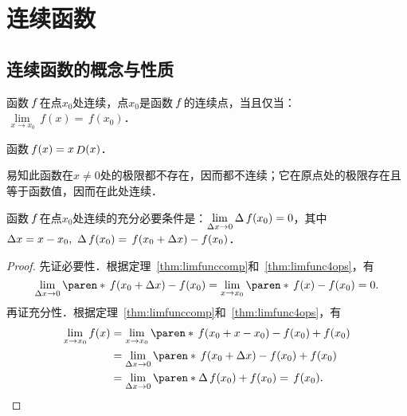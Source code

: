 \chapter{连续函数}
\label{ch:cont}

\section{连续函数的概念与性质}

\begin{definition}[连续]
  \label{defn:cont}
  函数\(\,f\mkern2mu\)在点\(x_0\)处连续，点\(x_0\)是函数\(\,f\mkern2mu\)的连续点，当且仅当：\(\!\lim\limits_{\,x\to x_0\!} \,f(x) = \,f(x_0)\)．
\end{definition}

\begin{example*}
  函数\(\,f(x) = x \mathop{\relax D}\nolimits(x)\)．

  \begin{remark}
    易知此函数在\(x \ne 0\)处的极限都不存在，因而都不连续；它在原点处的极限存在且等于函数值，因而在此处连续．
  \end{remark}
\end{example*}

\begin{theorem}
  \label{thm:contequivdefn}
  函数\(\,f\mkern2mu\)在点\(x_0\)处连续的充分必要条件是：\(\lim\limits_{\mathop{}\!\Delta x \to 0} \mathop{}\!\Delta\,f(x_0) = 0\)，其中\(\mathop{}\!\Delta x = x - x_0,\ \mathop{}\!\Delta\,f(x_0) = {}\,f(x_0+\mathop{}\!\Delta x) - f(x_0)\)．

  \begin{proof}
    先证必要性．根据定理~\ref{thm:limfunccomp}和~\ref{thm:limfunc4ops}，有
    \begin{equation*}
      \lim_{\fdx \to 0} \paren*{\,f(x_0 + \fdx) - f(x_0)}
      = \lim_{x\to x_0} \paren*{\,f(x) - f(x_0)}
      = 0.
    \end{equation*}
    再证充分性．根据定理~\ref{thm:limfunccomp}和~\ref{thm:limfunc4ops}，有
    \begin{equation*}
      \begin{split}
        \lim_{x\to x_0} f(x)
        &= \lim_{x\to x_0} \paren*{\,f(x_0 + x - x_0) - f(x_0) + f(x_0)} \\
        &= \lim_{\fdx \to 0} \paren*{\,f(x_0 + \fdx) - f(x_0) + f(x_0)} \\
        &= \lim_{\fdx \to 0} \paren*{\fwdf\,f(x_0) + f(x_0)} = \,f(x_0).
          \qedhere
      \end{split}
    \end{equation*}
  \end{proof}
\end{theorem}

